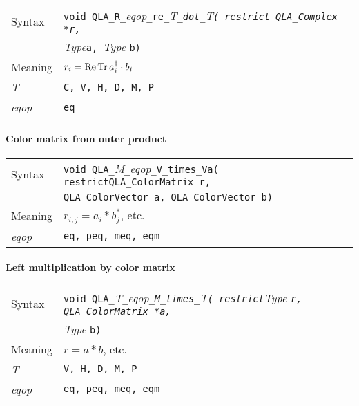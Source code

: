 \documentclass{article}
\renewcommand{\Re}{\mathop{\rm Re}}
\newcommand{\Tr}{\mathop{\rm Tr}}
\newcommand{\tColorMatrix}{QLA\ttdash ColorMatrix }
\newcommand{\tColorVector}{QLA\ttdash ColorVector }
\newcommand{\tqlaComplex}{QLA\ttdash Complex }
\newcommand{\namespace}{QLA}
\newcommand{\allEqOps}{{\tt eq, peq, meq, eqm}}
\newcommand{\ttdash}{{\tt \_}}
\newcommand{\itt}{\it T}
\newcommand{\extraarg}{}
\begin{document}
\begin{flushleft}
  \begin{tabular}{|l|l|}
  \hline
  Syntax      & {\tt void \namespace}\ttdash{\tt R}\ttdash{\it eqop}\ttdash{\tt re}\ttdash\itt\ttdash{\tt dot}\ttdash\itt{\tt ( restrict \tqlaComplex *r, }\\
              & {\it Type}{\tt *a, }{\it Type }{\tt *b\extraarg)} \\
  \hline
  Meaning     & $r_i = \Re \Tr a^\dagger_i \cdot b_i$ \\
  \hline
  \itt        & {\tt C, V, H, D, M, P} \\
  \hline
  {\it eqop}  & {\tt eq} \\
  \hline
  \end{tabular}
\end{flushleft}

\paragraph{Color matrix from outer product}

\begin{flushleft}
  \begin{tabular}{|l|l|}
  \hline
  Syntax      & {\tt void \namespace}\ttdash{\it M}\ttdash{\it eqop}\ttdash{\tt V}\ttdash{\tt times}\ttdash{\tt Va( restrict}{\tt \tColorMatrix }{\tt *r, }\\
              & {\tt \tColorVector }{\tt *a, }{\tt \tColorVector }{\tt *b\extraarg)} \\
  \hline
  Meaning     & $r_{i,j} = a_i * b_j^*$, etc. \\
  \hline
  {\it eqop}  & \allEqOps \\
  \hline
  \end{tabular}
\end{flushleft}

\paragraph{Left multiplication by color matrix}

\begin{flushleft}
  \begin{tabular}{|l|l|}
  \hline
  Syntax      & {\tt void \namespace}\ttdash\itt\ttdash{\it eqop}\ttdash{\tt M}\ttdash{\tt times}\ttdash\itt{\tt ( restrict}{\it Type }{\tt *r, \tColorMatrix *a, }\\
              & {\it Type }{\tt *b\extraarg)} \\
  \hline
  Meaning     & $r = a * b$, etc. \\
  \hline
  \itt        & {\tt V, H, D, M, P} \\
  \hline
  {\it eqop}  & \allEqOps \\
  \hline
  \end{tabular}
\end{flushleft}
\end{document}
